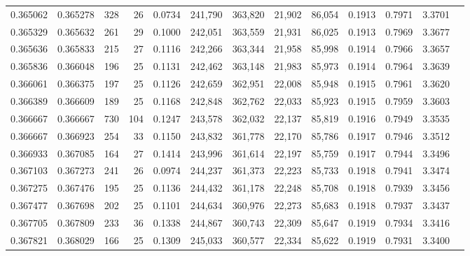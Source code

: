 \begin{tabular}{rrrrrrrrrrrrr}
0.365062 & 0.365278 &    328 &    26 &                                     0.0734 & 241,790 & 363,820 &  21,902 &  86,054 & 0.1913 & 0.7971 & 3.3701 \\
0.365329 & 0.365632 &    261 &    29 &                                     0.1000 & 242,051 & 363,559 &  21,931 &  86,025 & 0.1913 & 0.7969 & 3.3677 \\
0.365636 & 0.365833 &    215 &    27 &                                     0.1116 & 242,266 & 363,344 &  21,958 &  85,998 & 0.1914 & 0.7966 & 3.3657 \\
0.365836 & 0.366048 &    196 &    25 &                                     0.1131 & 242,462 & 363,148 &  21,983 &  85,973 & 0.1914 & 0.7964 & 3.3639 \\
0.366061 & 0.366375 &    197 &    25 &                                     0.1126 & 242,659 & 362,951 &  22,008 &  85,948 & 0.1915 & 0.7961 & 3.3620 \\
0.366389 & 0.366609 &    189 &    25 &                                     0.1168 & 242,848 & 362,762 &  22,033 &  85,923 & 0.1915 & 0.7959 & 3.3603 \\
0.366667 & 0.366667 &    730 &   104 &                                     0.1247 & 243,578 & 362,032 &  22,137 &  85,819 & 0.1916 & 0.7949 & 3.3535 \\
0.366667 & 0.366923 &    254 &    33 &                                     0.1150 & 243,832 & 361,778 &  22,170 &  85,786 & 0.1917 & 0.7946 & 3.3512 \\
0.366933 & 0.367085 &    164 &    27 &                                     0.1414 & 243,996 & 361,614 &  22,197 &  85,759 & 0.1917 & 0.7944 & 3.3496 \\
0.367103 & 0.367273 &    241 &    26 &                                     0.0974 & 244,237 & 361,373 &  22,223 &  85,733 & 0.1918 & 0.7941 & 3.3474 \\
0.367275 & 0.367476 &    195 &    25 &                                     0.1136 & 244,432 & 361,178 &  22,248 &  85,708 & 0.1918 & 0.7939 & 3.3456 \\
0.367477 & 0.367698 &    202 &    25 &                                     0.1101 & 244,634 & 360,976 &  22,273 &  85,683 & 0.1918 & 0.7937 & 3.3437 \\
0.367705 & 0.367809 &    233 &    36 &                                     0.1338 & 244,867 & 360,743 &  22,309 &  85,647 & 0.1919 & 0.7934 & 3.3416 \\
0.367821 & 0.368029 &    166 &    25 &                                     0.1309 & 245,033 & 360,577 &  22,334 &  85,622 & 0.1919 & 0.7931 & 3.3400 \\

\end{tabular}
